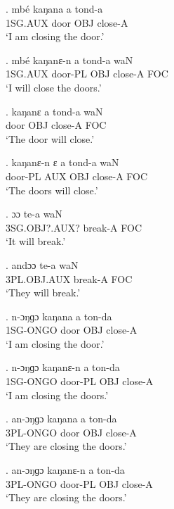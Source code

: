 \documentclass{assets/fieldnotes}
\begin{document}
\exg.
mbé       kaŋana   a     tond-a  \\
1SG.AUX   door     OBJ   close-A \\%
`I am closing the door.'

\exg.
mbé       kaŋanɛ-n   a     tond-a    waN \\
1SG.AUX   door-PL    OBJ   close-A   FOC \\%
`I will close the doors.'

\exg.
kaŋanɛ   a     tond-a    waN \\
door     OBJ   close-A   FOC \\%
`The door will close.'

\exg.
kaŋanɛ-n   ɛ     a     tond-a    waN \\
door-PL    AUX   OBJ   close-A   FOC \\%
`The doors will close.' \label{The doors will close}


\exg.
ɔɔ              te-a      waN \\
3SG.OBJ?.AUX?   break-A   FOC \\%
`It will break.' \label{It will break}


\exg.
andɔɔ         te-a      waN \\
3PL.OBJ.AUX   break-A   FOC \\%
`They will break.'

\exg.
n-ɔŋɡɔ     kaŋana   a     ton-da  \\
1SG-ONGO   door     OBJ   close-A \\%
`I am closing the door.'

\exg.
n-ɔŋɡɔ     kaŋanɛ-n   a     ton-da  \\
1SG-ONGO   door-PL    OBJ   close-A \\%
`I am closing the doors.'

\exg.
an-ɔŋɡɔ    kaŋana   a     ton-da  \\
3PL-ONGO   door     OBJ   close-A \\%
`They are closing the doors.'

\exg.
an-ɔŋɡɔ    kaŋanɛ-n   a     ton-da  \\
3PL-ONGO   door-PL    OBJ   close-A \\%
`They are closing the doors.'
\end{document}
